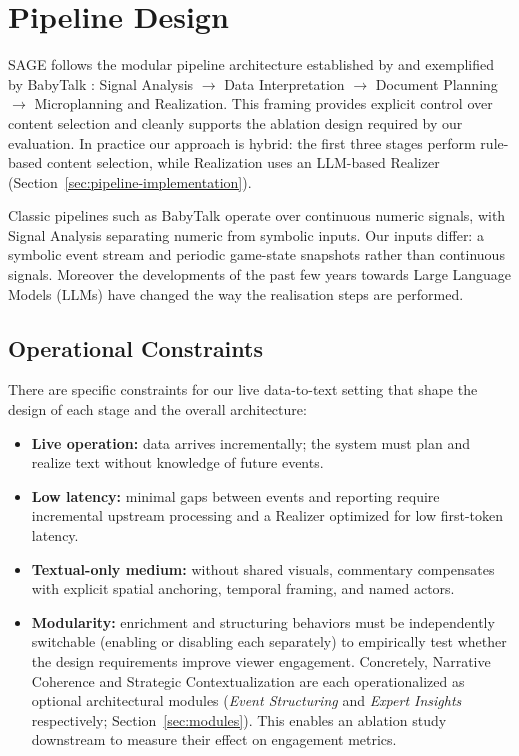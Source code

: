 \section{Pipeline Design}
SAGE follows the modular pipeline architecture established by \citet{reiter2000} and exemplified by BabyTalk \cite{reiter2007}: Signal Analysis $\rightarrow$ Data Interpretation $\rightarrow$ Document Planning $\rightarrow$ Microplanning and Realization. This framing provides explicit control over content selection and cleanly supports the ablation design required by our evaluation. In practice our approach is hybrid: the first three stages perform rule-based content selection, while Realization uses an LLM-based Realizer (Section~\ref{sec:pipeline-implementation}).

Classic pipelines such as BabyTalk \cite{reiter2007} operate over continuous numeric signals, with Signal Analysis separating numeric from symbolic inputs. Our inputs differ: a symbolic event stream and periodic game-state snapshots rather than continuous signals. Moreover the developments of the past few years towards Large Language Models (LLMs) have changed the way the realisation steps are performed.

\subsection{Operational Constraints}
There are specific constraints for our live data-to-text setting that shape the design of each stage and the overall architecture:

\begin{itemize}
  \item \textbf{Live operation:} data arrives incrementally; the system must plan and realize text without knowledge of future events.
  \item \textbf{Low latency:} minimal gaps between events and reporting \cite{lewandowski2012} require incremental upstream processing and a Realizer optimized for low first-token latency.
  \item \textbf{Textual-only medium:} without shared visuals, commentary compensates with explicit spatial anchoring, temporal framing, and named actors.
  \item \textbf{Modularity:} enrichment and structuring behaviors must be independently switchable (enabling or disabling each separately) to empirically test whether the design requirements improve viewer engagement. Concretely, Narrative Coherence and Strategic Contextualization are each operationalized as optional architectural modules (\textit{Event Structuring} and \textit{Expert Insights} respectively; Section~\ref{sec:modules}). This enables an ablation study downstream to measure their effect on engagement metrics.
\end{itemize}

